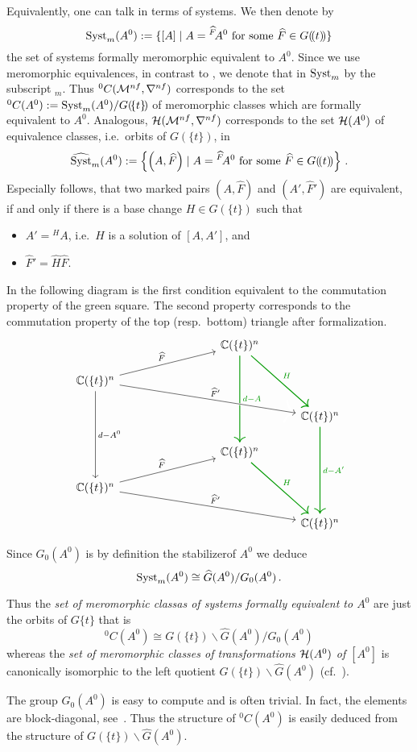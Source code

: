 Equivalently, one can talk in terms of systems. We then denote by
\[
  \operatorname{Syst}_m(A^0):=\{[A]
    \mid A={}^{\widehat F}\!A^0 \text{ for some } \widehat F\in G(\!(t)\!)\}
\]
the set of systems formally meromorphic equivalent to $A^0$.
Since we use meromorphic equivalences, in contrast to \cite{boalch,thboalch},
we denote that in $\operatorname{Syst}_m$ by the subscript ${}_m$.
Thus ${}^0C(\mathcal{M}^{nf},\nabla^{nf})$ corresponds to
the set ${}^0C(A^0):=\operatorname{Syst}_m(A^0)/G(\!\{t\}\!)$ of meromorphic classes which
are formally equivalent to $A^0$.
Analogous, $\mathcal{H}(\mathcal{M}^{nf},\nabla^{nf})$ corresponds to the set $\mathcal{H}(A^0)$ of
equivalence classes, i.e.\ orbits of $G(\!\{t\}\!)$, in
\[
  \widehat{\operatorname{Syst}}_m(A^0):=\left\{\left(A,\widehat F\right)
    \mid A={}^{\widehat F}\!A^0 \text{ for some } \widehat F\in G(\!(t)\!)\right\} \,.
\]
Especially follows, that two marked pairs $(A,\hat F)$ and $(A',\hat F')$ are
equivalent, if and only if there is a base change
$H\in G(\!\{t\}\!)$ such that
\begin{itemize}
  \item $A'={}^{H}\!A$, i.e.\ $H$ is a solution of $[A,A']$, and
  \item $\hat F'=\hat H\hat F$\PROBLEM[Source? correct? Maybe $\hat F'=H\hat F$].
\end{itemize}
In the following diagram is the first condition equivalent to the commutation
property of the \textcolor{green!60!black}{green} square. The second property
corresponds to the commutation property of the top (resp.\ bottom) triangle
after formalization\PROBLEM[?].
\[ \begin{tikzcd}[column sep=1cm,row sep=.5cm]
  &&&\C(\{t\})^n \arrow[green!60!black, thick]{ddd}{d-A}
    \arrow[green!60!black, thick]{ddr}{H}
\\\C(\{t\})^n \arrow{rrru}{\hat F}
  \arrow[ultra thick, white]{rrrrd}{\hat F'}
  \arrow{rrrrd}{\hat F'}
  \arrow{ddd}{d-A^0}
\\&&&&\C(\{t\})^n \arrow[green!60!black, thick]{ddd}{d-A'}
\\&&&\C(\{t\})^n \arrow[green!60!black, thick]{ddr}{H}
\\\C(\{t\})^n \arrow{rrru}{\hat F} \arrow{rrrrd}{\hat F'}
\\&&&&\C(\{t\})^n
\end{tikzcd} \]

\begin{lem}
  Since $G_0(A^0)$ is by definition the stabilizer\PROBLEM[correct?] of $A^0$ we
  deduce
  \[
    \operatorname{Syst}_m(A^0)\cong \widehat G(A^0)/G_0(A^0) \,.
  \]
  \begin{s-cor}
    Thus the \emph{set of meromorphic classas of systems formally equivalent
      to $A^0$} are just the orbits of $G\{t\}$ that is
    \[
      {}^0C(A^0)\cong G(\!\{t\}\!)\backslash\hat G(A^0)/G_0(A^0)
    \]
    whereas the \emph{set of meromorphic classes of transformations $\mathcal{H}(A^0)$
    of $[A^0]$} is canonically isomorphic to the left quotient
    $G(\!\{t\}\!)\backslash\hat G(A^0)$ (cf.\ \cite[Lem.1.17]{thboalch}).
  \end{s-cor}
\end{lem}

The group $G_0(A^0)$ is easy to compute and is often trivial. In fact, the
elements are block-diagonal,
see~\cite[77]{Loday2014}.
Thus the structure of ${}^0C(A^0)$ is easily deduced from the structure of
$G(\!\{t\}\!)\backslash\hat G(A^0)$.
